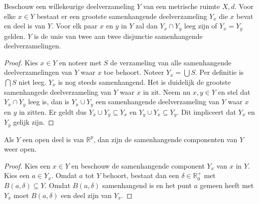 \documentclass[main.tex]{subfiles}
\begin{document}
\begin{bpr}
  Beschouw een willekeurige deelverzameling $Y$ van een metrische ruimte $X,d$.
  Voor elke $x\in Y$ bestaat er een grootste samenhangende deelverzameling $Y_{x}$ die $x$ bevat en deel is van $Y$.
  Voor elk paar $x$ en $y$ in $Y$ zal dan $Y_{x} \cap Y_{y}$ leeg zijn of $Y_{x} = Y_{y}$ gelden.
  $Y$ is de unie van twee aan twee disjunctie samenhangende deelverzamelingen.

  \begin{proof}
    Kies $x\in Y$ en noteer met $S$ de verzameling van alle samenhangende deelverzamelingen van $Y$ waar $x$ toe behoort.
    Noteer $Y_{x} = \bigcup S$.
    Per definitie is $\bigcap S$ niet leeg.
    $Y_{x}$ is nog steeds samenhangend.
    Het is duidelijk de grootste samenhangede deelverzameling van $Y$ waar $x$ in zit.
    Neem nu $x,y\in Y$ en stel dat $Y_{x}\cap Y_{y}$ leeg is, dan is $Y_{x}\cup Y_{y}$ een samenhangende deelverzameling van $Y$ waar $x$ en $y$ in zitten.
    Er geldt dus $Y_{x} \cup Y_{y} \subseteq Y_{x}$ en $Y_{y} \cup Y_{x} \subseteq Y_{y}$.
    Dit impliceert dat $Y_{x}$ en $Y_{y}$ gelijk zijn.
  \end{proof}
\end{bpr}

\begin{bpr}
 Als $Y$ een open deel is van $\mathbb{R}^{p}$, dan zijn de samenhangende componenten van $Y$ weer open.

 \begin{proof}
   Kies een $x\in Y$ en beschouw de samenhangende component $Y_{x}$ van $x$ in $Y$.
   Kies een $a\in Y_{x}$.
   Omdat $a$ tot $Y$ behoort, bestaat dan een $\delta \in \mathbb{R}_{0}^{+}$ met $B(a,\delta) \subseteq Y$.
   Omdat $B(a,\delta)$ samenhangend is en het punt $a$ gemeen heeft met $Y_{x}$ moet $B(a,\delta)$ een deel zijn van $Y_{x}$.
 \end{proof}
\end{bpr}
\end{document}

